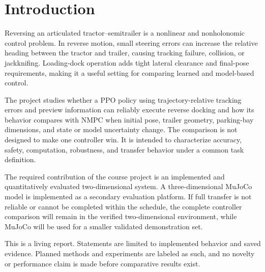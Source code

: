 \section{Introduction}

Reversing an articulated tractor--semitrailer is a nonlinear and nonholonomic
control problem. In reverse motion, small steering errors can increase the
relative heading between the tractor and trailer, causing tracking failure,
collision, or jackknifing. Loading-dock operation adds tight lateral clearance
and final-pose requirements, making it a useful setting for comparing learned
and model-based control.

The project studies whether a PPO policy using trajectory-relative tracking
errors and preview information can reliably execute reverse docking and how its
behavior compares with NMPC when initial pose, trailer geometry, parking-bay
dimensions, and state or model uncertainty change. The comparison is not
designed to make one controller win. It is intended to characterize accuracy,
safety, computation, robustness, and transfer behavior under a common task
definition.

The required contribution of the course project is an implemented and
quantitatively evaluated two-dimensional system. A three-dimensional MuJoCo
model is implemented as a secondary evaluation platform. If full transfer is
not reliable or cannot be completed within the schedule, the complete
controller comparison will remain in the verified two-dimensional environment,
while MuJoCo will be used for a smaller validated demonstration set.

This is a living report. Statements are limited to implemented behavior and
saved evidence. Planned methods and experiments are labeled as such, and no
novelty or performance claim is made before comparative results exist.
